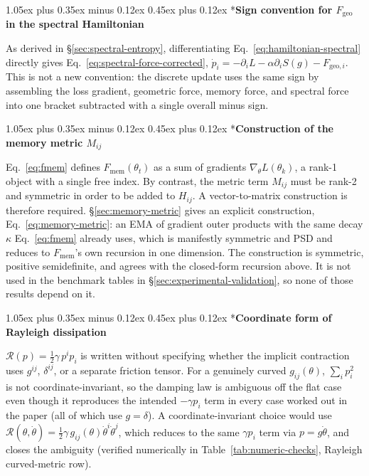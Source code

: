 \documentclass[10pt,twocolumn]{article}
\makeatletter
\newcommand{\finding}[1]{\textbf{#1}}
\renewcommand\subsection{\@startsection{subsection}{2}{0pt}%
  {1.05ex plus 0.35ex minus 0.12ex}%
  {0.45ex plus 0.12ex}%
  {\normalsize\bfseries}}
\makeatother
\begin{document}
\subsection*{\finding{Sign convention for $F_{\mathrm{geo}}$ in the spectral Hamiltonian}}

As derived in \S\ref{sec:spectral-entropy}, differentiating
Eq.~\eqref{eq:hamiltonian-spectral} directly gives
Eq.~\eqref{eq:spectral-force-corrected}, $\dot p_i = -\partial_i L -
\alpha\partial_i S(g) - F_{\mathrm{geo},i}$. This is not a new convention:
the discrete update uses the same sign by assembling the loss gradient,
geometric force, memory force, and spectral force into one bracket subtracted
with a single overall minus sign.

\subsection*{\finding{Construction of the memory metric $M_{ij}$}}

Eq.~\eqref{eq:fmem} defines $F_{\mathrm{mem}}(\theta_t)$ as a sum of gradients
$\nabla_\theta L(\theta_k)$, a rank-1 object with a single free index. By
contrast, the metric term $M_{ij}$ must be rank-2 and symmetric in order to
be added to $H_{ij}$. A vector-to-matrix construction is therefore required.
\S\ref{sec:memory-metric} gives an explicit construction,
Eq.~\eqref{eq:memory-metric}: an EMA of gradient outer products with the same
decay $\kappa$ Eq.~\eqref{eq:fmem} already uses, which is manifestly symmetric
and PSD and reduces to $F_{\mathrm{mem}}$'s own recursion in one dimension.
The construction is symmetric, positive semidefinite, and agrees with the
closed-form recursion above. It is not used in the benchmark tables in
\S\ref{sec:experimental-validation}, so none of those results depend on it.

\subsection*{\finding{Coordinate form of Rayleigh dissipation}}

$\mathcal R(p) = \tfrac12\gamma\, p^i p_i$ is written without specifying
whether the implicit contraction uses $g^{ij}$, $\delta^{ij}$, or a separate
friction tensor. For a genuinely curved $g_{ij}(\theta)$, $\sum_i p_i^2$ is not
coordinate-invariant, so the damping law is ambiguous off the flat case even
though it reproduces the intended $-\gamma p_i$ term in every case
worked out in the paper (all of which use $g=\delta$). A coordinate-invariant
choice would use $\mathcal R(\theta,\dot\theta) = \tfrac12\gamma\,
g_{ij}(\theta)\dot\theta^i\dot\theta^j$, which reduces to the same $\gamma p_i$
term via $p = g\dot\theta$, and closes the ambiguity (verified numerically in
Table~\ref{tab:numeric-checks}, Rayleigh curved-metric row).
\end{document}
